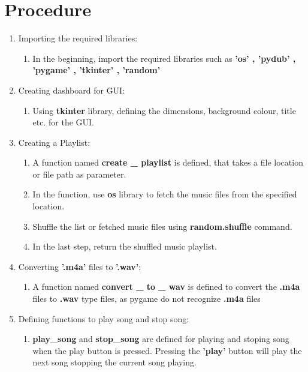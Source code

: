 \documentclass[journal,12pt,twocolumn]{IEEEtran}
\begin{document}
\section*{\textbf{Procedure}}
\begin{enumerate}
	\item
		Importing the required libraries:
		\begin{enumerate}
			\item[\textbullet]
				In the beginning, import the required libraries such as \textbf{ 'os' , 'pydub' , 'pygame' , 'tkinter' , 'random' }
		\end{enumerate}
	\item
		Creating dashboard for GUI:
		\begin{enumerate}
			\item[\textbullet]
				Using \textbf{tkinter} library, defining the dimensions, background colour, title etc. for the GUI.
		\end{enumerate}
	\item
		Creating a Playlist:
		\begin{enumerate}
			\item[\textbullet]
				A function named \textbf{create \_ playlist} is defined, that takes a file location or file path as parameter.
			\item[\textbullet]
				In the function, use \textbf{os} library to fetch the music files from the specified location.
			\item[\textbullet]
				Shuffle the list or fetched music files using \textbf{random.shuffle} command.
			\item[\textbullet]
				In the last step, return the shuffled music playlist.
		\end{enumerate}
	\item
		Converting \textbf{'.m4a'} files to \textbf{'.wav'}:
		\begin{enumerate}
			\item[\textbullet]
				A function named \textbf{convert \_ to \_ wav} is defined to convert the \textbf{.m4a} files to \textbf{.wav} type files, as pygame do not recognize \textbf{.m4a} files 
		\end{enumerate}
	\item
		Defining functions to play song and stop song:
		\begin{enumerate}
			\item[\textbullet]
				\textbf{play\_song} and \textbf{stop\_song} are defined for playing and stoping song when the play button is pressed.
				Pressing the \textbf{'play'} button will play the next song stopping the current song playing.

\end{enumerate}
\end{enumerate}
\end{document}
